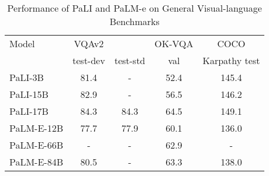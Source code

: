 \begin{table}
\scriptsize
\centering
\begin{tabular}{lcccc}
        \toprule
        Model & VQAv2 & & OK-VQA & COCO  \\
        & test-dev & test-std & val & Karpathy test \\
        \midrule
        PaLI-3B & 81.4 & - & 52.4 & 145.4 \\
        PaLI-15B & 82.9 & - & 56.5&  146.2 \\
        PaLI-17B & 84.3 & 84.3 & 64.5 & 149.1\\
        PaLM-E-12B & 77.7 & 77.9 & 60.1 & 136.0 \\
        PaLM-E-66B & - & - & 62.9 & - \\
        PaLM-E-84B & 80.5 & - & 63.3 & 138.0 \\
        \bottomrule
    \end{tabular}
    \caption{Performance of PaLI \citep{DBLP:conf/iclr/Chen0CPPSGGMB0P23} and PaLM-e \citep{DBLP:conf/icml/DriessXSLCIWTVY23} on General Visual-language Benchmarks}
    \label{tab:task_specific_finetuned_models}
\end{table}